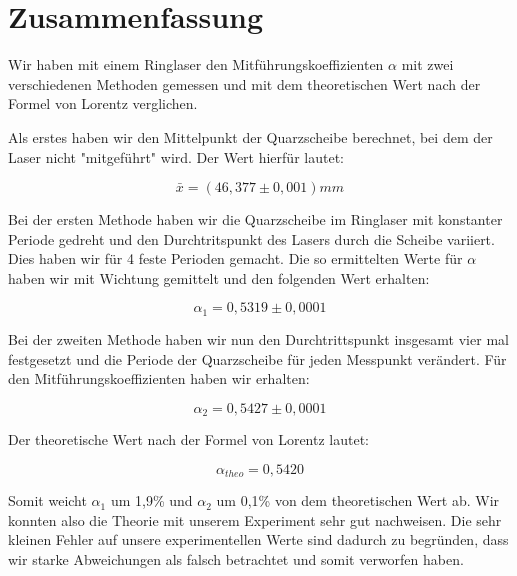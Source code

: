 \section{Zusammenfassung}

Wir haben mit einem Ringlaser den Mitführungskoeffizienten $\alpha$ mit zwei verschiedenen Methoden gemessen und mit dem theoretischen Wert nach der Formel von Lorentz verglichen.

Als erstes haben wir den Mittelpunkt der Quarzscheibe berechnet, bei dem der Laser nicht "mitgeführt" wird. Der Wert hierfür lautet:

$$\bar x = (46,377 \pm 0,001) mm$$

Bei der ersten Methode haben wir die Quarzscheibe im Ringlaser mit konstanter Periode gedreht und den Durchtritspunkt des Lasers durch die Scheibe variiert. Dies haben wir für 4 feste Perioden gemacht. Die so ermittelten Werte für $\alpha$ haben wir mit Wichtung gemittelt und den folgenden Wert erhalten:

$$\alpha_1 = 0,5319 \pm 0,0001$$

Bei der zweiten Methode haben wir nun den Durchtrittspunkt insgesamt vier mal festgesetzt und die Periode der Quarzscheibe für jeden Messpunkt verändert. Für den Mitführungskoeffizienten haben wir erhalten:

$$\alpha_2 = 0,5427 \pm 0,0001$$

Der theoretische Wert nach der Formel von Lorentz lautet:

$$\alpha_{theo} = 0,5420$$

Somit weicht $\alpha_1$ um 1,9\% und $\alpha_2$ um 0,1\% von dem theoretischen Wert ab. Wir konnten also die Theorie mit unserem Experiment sehr gut nachweisen. Die sehr kleinen Fehler auf unsere experimentellen Werte sind dadurch zu begründen, dass wir starke Abweichungen als falsch betrachtet und somit  verworfen haben.

\clearpage